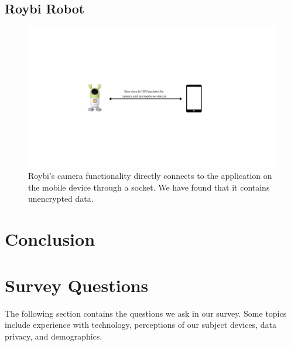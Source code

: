 \documentclass[12pt]{ucthesis}
\begin{document}
\section{Roybi Robot}
\begin{figure}
    \label{fig:udp}
    \includegraphics[width=\textwidth]{udp.jpg}
    \caption{Roybi's camera functionality directly connects to the application on the mobile device through a socket. We have found that it contains unencrypted data.}
\end{figure}

\chapter{Conclusion}
\label{ch:conclusion}


\nocite{*}




\appendix
\chapter{Survey Questions}
\label{app:questions}
The following section contains the questions we ask in our survey. Some topics include experience with technology, perceptions of our subject devices, data privacy, and demographics.
\end{document}
